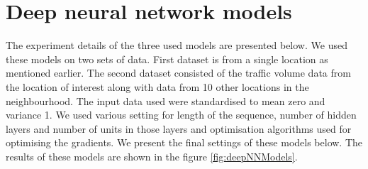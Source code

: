 \section{Deep neural network models}
The experiment details of the three used models are presented below.
We used these models on two sets of data. First dataset is from a single location as mentioned earlier.
The second dataset consisted of the traffic volume data from the location of interest along with data
from 10 other locations in the neighbourhood.
The input data used were standardised to mean zero and variance 1. We used various setting for
length of the sequence, number of hidden layers and number of units in those layers and optimisation
algorithms used for optimising the gradients. We present the final settings of these models below.
The results of these models are shown in the figure \ref{fig:deepNNModels}.


